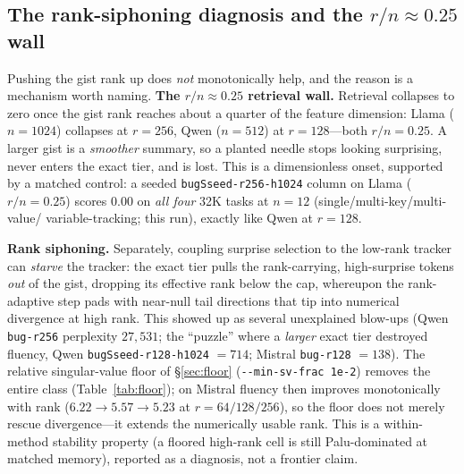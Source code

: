 \documentclass[11pt]{article}
\begin{document}
\subsection{The rank-siphoning diagnosis and the $r/n\approx0.25$ wall}
\label{sec:siphon}
Pushing the gist rank up does \emph{not} monotonically help, and the reason is a
mechanism worth naming. \textbf{The $r/n\approx0.25$ retrieval wall.} Retrieval
collapses to zero once the gist rank reaches about a quarter of the feature
dimension: Llama ($n{=}1024$) collapses at $r{=}256$, Qwen ($n{=}512$) at
$r{=}128$---both $r/n = 0.25$. A larger gist is a \emph{smoother} summary, so a
planted needle stops looking surprising, never enters the exact tier, and is lost.
This is a dimensionless onset, supported by a matched control: a seeded
\texttt{bugSseed-r256-h1024} column on Llama ($r/n{=}0.25$) scores
$0.00$ on \emph{all four} 32K tasks at $n{=}12$ (single/multi-key/multi-value/
variable-tracking; this run), exactly like Qwen at $r{=}128$.

\textbf{Rank siphoning.} Separately, coupling surprise selection to the low-rank
tracker can \emph{starve} the tracker: the exact tier pulls the rank-carrying,
high-surprise tokens \emph{out} of the gist, dropping its effective rank below
the cap, whereupon the rank-adaptive step pads with near-null tail directions
that tip into numerical divergence at high rank. This showed up as several
unexplained blow-ups (Qwen \texttt{bug-r256} perplexity $27{,}531$; the ``puzzle''
where a \emph{larger} exact tier destroyed fluency, Qwen
\texttt{bugSseed-r128-h1024} $=714$; Mistral \texttt{bug-r128} $=138$). The
relative singular-value floor of \S\ref{sec:floor} (\texttt{-{}-min-sv-frac 1e-2})
removes the entire class (Table~\ref{tab:floor}); on Mistral fluency then improves
monotonically with rank ($6.22\to5.57\to5.23$ at $r{=}64/128/256$), so the floor
does not merely rescue divergence---it extends the numerically usable rank. This
is a within-method stability property (a floored high-rank cell is still
Palu-dominated at matched memory), reported as a diagnosis, not a frontier claim.
\end{document}
